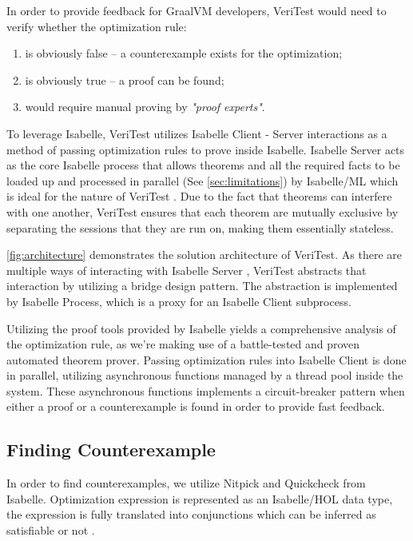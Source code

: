 \documentclass[conference,a4paper,english,10pt]{IEEEtran}[2015/08/26]
\begin{document}
In order to provide feedback for GraalVM developers, VeriTest would need to verify whether the optimization rule:

\begin{enumerate}
  \item is obviously false -- a counterexample exists for the optimization;
  \item is obviously true -- a proof can be found;
  \item would require manual proving by \emph{"proof experts"}.
\end{enumerate}

To leverage Isabelle, VeriTest utilizes Isabelle Client - Server \cite{isabelleSystem} interactions as a method of passing optimization 
rules to prove inside Isabelle. Isabelle Server acts as the core Isabelle process that allows theorems and all the required facts to 
be loaded up and processed in parallel (See \cref{sec:limitations}) by Isabelle/ML which is ideal for the nature of VeriTest 
\cite[Ch. 4.2.6]{isabelleSystem}. Due to the fact that theorems can interfere with one another, VeriTest ensures that each theorem are 
mutually exclusive by separating the sessions that they are run on, making them essentially stateless.

\cref{fig:architecture} demonstrates the solution architecture of VeriTest. As there are multiple ways of interacting with Isabelle Server 
\cite[Ch. 4.2]{isabelleSystem}, VeriTest abstracts that interaction by utilizing a bridge design pattern. The abstraction is implemented by 
Isabelle Process, which is a proxy for an Isabelle Client subprocess. 

Utilizing the proof tools provided by Isabelle yields a comprehensive analysis of the optimization rule, as we're making use of a battle-tested 
and proven automated theorem prover. Passing optimization rules into Isabelle Client is done in parallel, utilizing asynchronous functions managed 
by a thread pool inside the system. These asynchronous functions implements a circuit-breaker pattern when either a proof or a counterexample is 
found in order to provide fast feedback.

\subsection{Finding Counterexample}
\label{sec:findcounterexample}

In order to find counterexamples, we utilize Nitpick and Quickcheck from Isabelle. Optimization expression is represented as an Isabelle/HOL 
data type, the expression is fully translated into conjunctions which can be inferred as satisfiable or not \cite[Sec. 2]{Term_Graph_Optimizations}.
\end{document}
